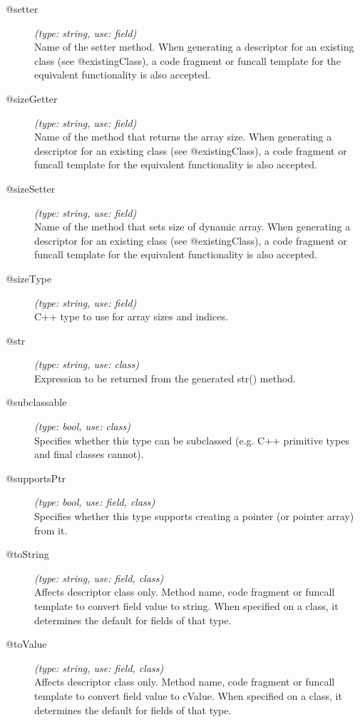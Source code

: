 \begin{description}
\item[@setter] \textit{(type: string, use: field)} \\
  Name of the setter method. When generating a descriptor for an existing
  class (see @existingClass), a code fragment or funcall template for the
  equivalent functionality is also accepted.

\item[@sizeGetter] \textit{(type: string, use: field)} \\
  Name of the method that returns the array size. When generating a descriptor
  for an existing class (see @existingClass), a code fragment or funcall
  template for the equivalent functionality is also accepted.

\item[@sizeSetter] \textit{(type: string, use: field)} \\
  Name of the method that sets size of dynamic array. When generating a
  descriptor for an existing class (see @existingClass), a code fragment or
  funcall template for the equivalent functionality is also accepted.

\item[@sizeType] \textit{(type: string, use: field)} \\
  C++ type to use for array sizes and indices.

\item[@str] \textit{(type: string, use: class)} \\
  Expression to be returned from the generated str() method.

\item[@subclassable] \textit{(type: bool, use: class)} \\
  Specifies whether this type can be subclassed (e.g. C++ primitive types and
  final classes cannot).

\item[@supportsPtr] \textit{(type: bool, use: field, class)} \\
  Specifies whether this type supports creating a pointer (or pointer array)
  from it.

\item[@toString] \textit{(type: string, use: field, class)} \\
  Affects descriptor class only. Method name, code fragment or funcall
  template to convert field value to string. When specified on a class, it
  determines the default for fields of that type.

\item[@toValue] \textit{(type: string, use: field, class)} \\
  Affects descriptor class only. Method name, code fragment or funcall
  template to convert field value to cValue. When specified on a class, it
  determines the default for fields of that type.

\end{description}


